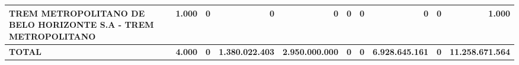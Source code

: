 \documentclass{article}
\begin{document}
\begin{longtable}[c]{m{2.0cm}|m{1.35cm}|m{1.35cm}|m{1.35cm}|m{1.35cm}|m{1.35cm}|m{1.35cm}|m{1.35cm}|m{1.35cm}|m{1.0cm}}
\multicolumn{1}{L{4cm}|}{TREM METROPOLITANO DE BELO HORIZONTE S.A - TREM METROPOLITANO} & \multicolumn{1}{r|}{1.000} & \multicolumn{1}{r|}{0} & \multicolumn{1}{r|}{            0} & \multicolumn{1}{r|}{            0} & \multicolumn{1}{r|}{0} & \multicolumn{1}{r|}{0} & \multicolumn{1}{r|}{            0} & \multicolumn{1}{r|}{0} & \multicolumn{1}{r}{ \textbf{1.000}} \\
\hline
\multicolumn{1}{L{4cm}|}{ \textbf{TOTAL}} & \multicolumn{1}{r|}{ \textbf{4.000}} & \multicolumn{1}{r|}{ \textbf{0}} & \multicolumn{1}{r|}{ \textbf{1.380.022.403}} & \multicolumn{1}{r|}{ \textbf{2.950.000.000}} & \multicolumn{1}{r|}{ \textbf{0}} & \multicolumn{1}{r|}{ \textbf{0}} & \multicolumn{1}{r|}{ \textbf{6.928.645.161}} & \multicolumn{1}{r|}{ \textbf{0}} & \multicolumn{1}{r}{ \textbf{11.258.671.564}} \\
\end{longtable}
\newpage
{}
\end{document}
